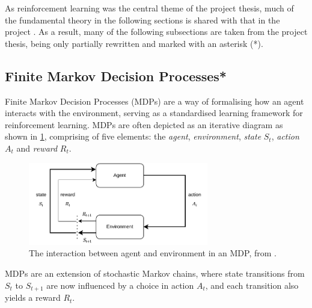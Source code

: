 As reinforcement learning was the central theme of the project thesis, much of the fundamental theory in the following sections is shared with that in the project \cite{project_thesis}. As a result, many of the following subsections are taken from the project thesis, being only partially rewritten and marked with an asterisk (*).

\subsection{Finite Markov Decision Processes*}
\label{subsec:2_MDPs}

Finite Markov Decision Processes (MDPs) are a way of formalising how an agent interacts with the environment, serving as a standardised learning framework for reinforcement learning. MDPs are often depicted as an iterative diagram as shown in \cref{fig:2_MDP}, comprising of five elements: the \textit{agent}, \textit{environment}, \textit{state} $S_t$, \textit{action} $A_t$ and \textit{reward} $R_t$.
\begin{figure}[hbt]
    \centering
    \includegraphics[width=0.7\textwidth]{figures/2_RL/2_mdp.pdf}
    \caption{The interaction between agent and environment in an MDP, from \cite{suttonAndBartoBook}.}
    \label{fig:2_MDP}
\end{figure}
MDPs are an extension of stochastic Markov chains, where state transitions from $S_t$ to $S_{t+1}$ are now influenced by a choice in action $A_t$, and each transition also yields a reward $R_t$.

